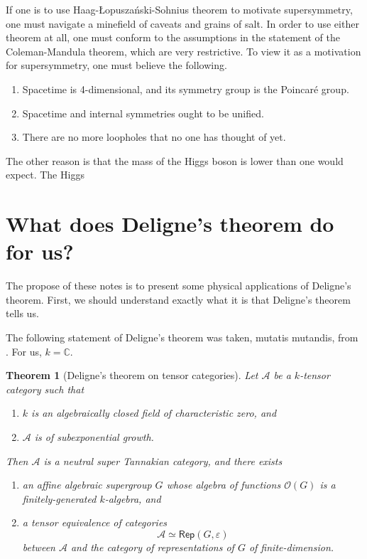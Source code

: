 \documentclass[a4paper,10pt]{scrreprt}
\newcommand{\C}{\mathbb{C}}
\theoremstyle{definition}
\theoremstyle{plain}
\newtheorem{theorem}{Theorem}[section]
\theoremstyle{remark}
\begin{document}
If one is to use Haag-{\L}opusza{\'n}ski-Sohnius theorem to motivate supersymmetry, one must navigate a minefield of caveats and grains of salt. In order to use either theorem at all, one must conform to the assumptions in the statement of the Coleman-Mandula theorem, which are very restrictive. To view it as a motivation for supersymmetry, one must believe the following.
\begin{enumerate}
  \item Spacetime is 4-dimensional, and its symmetry group is the Poincar{\'e} group.

  \item Spacetime and internal symmetries ought to be unified.

  \item There are no more loopholes that no one has thought of yet.
\end{enumerate}

The other reason is that the mass of the Higgs boson is lower than one would expect. The Higgs 

\section{What does Deligne's theorem do for us?}
The propose of these notes is to present some physical applications of Deligne's theorem. First, we should understand exactly what it is that Deligne's theorem tells us.

The following statement of Deligne's theorem was taken, mutatis mutandis, from \cite{nlab-deligne-theorem}. For us, $k = \C$.

\renewcommand{\thetheorem}{\ref*{thm:delignestheorem}}
\begin{theorem}[Deligne's theorem on tensor categories]
  Let $\mathscr{A}$ be a $k$-tensor category such that
  \begin{enumerate}
    \item $k$ is an algebraically closed field of characteristic zero, and

    \item $\mathscr{A}$ is of subexponential growth.
  \end{enumerate}

  Then $\mathscr{A}$ is a neutral super Tannakian category, and there exists 
  \begin{enumerate}
    \item an affine algebraic supergroup $G$ whose algebra of functions $\mathscr{O}(G)$ is a finitely-generated $k$-algebra, and 

    \item a tensor equivalence of categories
      \begin{equation*}
        \mathscr{A} \simeq \mathsf{Rep}(G, \varepsilon)
      \end{equation*}
      between $\mathscr{A}$ and the category of representations of $G$ of finite-dimension.
  \end{enumerate}
\end{theorem}
\renewcommand{\thetheorem}{\arabic{theorem}}
\end{document}

